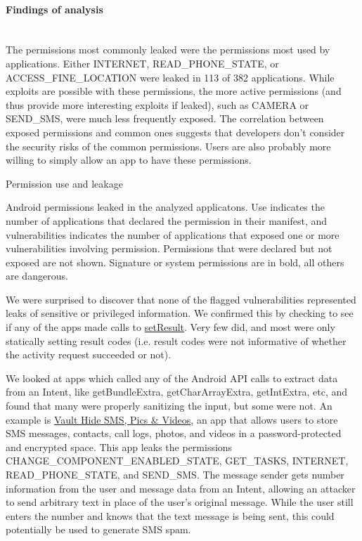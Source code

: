 \documentclass[12pt,a4paper]{article}
\begin{document}
\paragraph{Findings of analysis} ~\\
The permissions most commonly leaked were the permissions most used by
applications. Either INTERNET, READ\_PHONE\_STATE, or ACCESS\_FINE\_LOCATION
were leaked in 113 of 382 applications. While exploits are possible with these
permissions, the more active permissions (and thus provide more interesting
exploits if leaked), such as CAMERA or SEND\_SMS, were much less frequently
exposed. The correlation between exposed permissions and common ones suggests
that developers don't consider the security risks of the common permissions.
Users are also probably more willing to simply allow an app to have these
permissions.
\begin{table}
\caption{Permission use and leakage}

\caption*{Android permissions leaked in the analyzed applicatons. Use indicates
  the number of applications that declared the permission in their manifest, and
  vulnerabilities indicates the number of applications that exposed one or more
  vulnerabilities involving permission.  Permissions that were declared but not
  exposed are not shown. Signature or system permissions are in bold, all others
  are dangerous.}\label{tab:results}
\end{table}

We were surprised to discover that none of the flagged vulnerabilities
represented leaks of sensitive or privileged information. We confirmed this by
checking to see if any of the apps made calls to
\href{https://developer.android.com/reference/android/app/Activity.html#setResult\%28int\%29}{setResult}. Very
few did, and most were only statically setting result codes (i.e. result codes
were not informative of whether the activity request succeeded or not).

We looked at apps which called any of the Android API calls to extract data from
an Intent, like getBundleExtra, getCharArrayExtra, getIntExtra, etc, and found
that many were properly sanitizing the input, but some were not. An example is
\href{https://play.google.com/store/apps/details?id=com.netqin.ps\&feature=search\_result#?t=W251bGwsMSwxLDEsImNvbS5uZXRxaW4ucHMiXQ..}{Vault
  Hide SMS, Pics \& Videos}, an app that allows users to store SMS messages,
contacts, call logs, photos, and videos in a password-protected and encrypted
space. This app leaks the permissions CHANGE\_COMPONENT\_ENABLED\_STATE,
GET\_TASKS, INTERNET, READ\_PHONE\_STATE, and SEND\_SMS. The message sender
gets number information from the user and message data from an Intent, allowing
an attacker to send arbitrary text in place of the user's original message.
While the user still enters the number and knows that the text message is being
sent, this could potentially be used to generate SMS spam.
\end{document}
